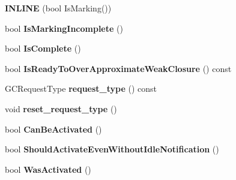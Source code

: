 \begin{DoxyCompactItemize}
\item 
{\bfseries I\+N\+L\+I\+NE} (bool Is\+Marking())\hypertarget{classv8_1_1internal_1_1_incremental_marking_a766aa5c1c3be4547547bc0f343b18601}{}\label{classv8_1_1internal_1_1_incremental_marking_a766aa5c1c3be4547547bc0f343b18601}

\item 
bool {\bfseries Is\+Marking\+Incomplete} ()\hypertarget{classv8_1_1internal_1_1_incremental_marking_a709731f452c9666a1a85040f9800d981}{}\label{classv8_1_1internal_1_1_incremental_marking_a709731f452c9666a1a85040f9800d981}

\item 
bool {\bfseries Is\+Complete} ()\hypertarget{classv8_1_1internal_1_1_incremental_marking_ae0f9fcf099dbebe313fd15cce9fef50d}{}\label{classv8_1_1internal_1_1_incremental_marking_ae0f9fcf099dbebe313fd15cce9fef50d}

\item 
bool {\bfseries Is\+Ready\+To\+Over\+Approximate\+Weak\+Closure} () const \hypertarget{classv8_1_1internal_1_1_incremental_marking_a035ec8bd64bc96d2e0d146c71411d0af}{}\label{classv8_1_1internal_1_1_incremental_marking_a035ec8bd64bc96d2e0d146c71411d0af}

\item 
G\+C\+Request\+Type {\bfseries request\+\_\+type} () const \hypertarget{classv8_1_1internal_1_1_incremental_marking_af9d668ccf4cbc0a17948cd6f32673b76}{}\label{classv8_1_1internal_1_1_incremental_marking_af9d668ccf4cbc0a17948cd6f32673b76}

\item 
void {\bfseries reset\+\_\+request\+\_\+type} ()\hypertarget{classv8_1_1internal_1_1_incremental_marking_a6ecf54e021cf89a81447e077e66e6a66}{}\label{classv8_1_1internal_1_1_incremental_marking_a6ecf54e021cf89a81447e077e66e6a66}

\item 
bool {\bfseries Can\+Be\+Activated} ()\hypertarget{classv8_1_1internal_1_1_incremental_marking_a76c0db66709367a8f89548a137b5174d}{}\label{classv8_1_1internal_1_1_incremental_marking_a76c0db66709367a8f89548a137b5174d}

\item 
bool {\bfseries Should\+Activate\+Even\+Without\+Idle\+Notification} ()\hypertarget{classv8_1_1internal_1_1_incremental_marking_a4fe588e5e03eef029511675e3e69ce7d}{}\label{classv8_1_1internal_1_1_incremental_marking_a4fe588e5e03eef029511675e3e69ce7d}

\item 
bool {\bfseries Was\+Activated} ()\hypertarget{classv8_1_1internal_1_1_incremental_marking_aefa314a1555627c9212bc09ba56fb4c0}{}\label{classv8_1_1internal_1_1_incremental_marking_aefa314a1555627c9212bc09ba56fb4c0}


\end{DoxyCompactItemize}
